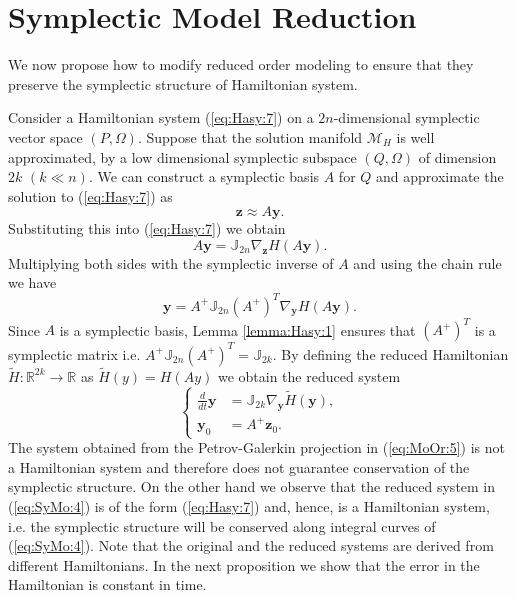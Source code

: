 \section{Symplectic Model Reduction} \label{chap:SyMo:1}
We now propose how to modify reduced order modeling to ensure that they preserve the symplectic structure of Hamiltonian system. 


Consider a Hamiltonian system (\ref{eq:Hasy:7}) on a $2n$-dimensional symplectic vector space $(P,\Omega)$. Suppose that the solution manifold $\mathcal M_H$ is well approximated, by a low dimensional symplectic subspace $(Q,\Omega)$ of dimension $2k$ $(k\ll n)$. We can construct a symplectic basis $A$ for $Q$ and approximate the solution to (\ref{eq:Hasy:7}) as
\begin{equation} \label{eq:SyMo:1}
	\mathbf z \approx A\mathbf y.
\end{equation}
Substituting this into (\ref{eq:Hasy:7}) we obtain
\begin{equation} \label{eq:SyMo:2}
	A\mathbf y = \mathbb{J}_{2n} \nabla_{\mathbf z} H(A \mathbf y). 
\end{equation}
Multiplying both sides with the symplectic inverse of $A$ and using the chain rule we have
\begin{equation} \label{eq:SyMo:3}
	\mathbf y = A^+ \mathbb J_{2n} (A^+)^T \nabla_{\mathbf y} H(A\mathbf y).
\end{equation}
Since $A$ is a symplectic basis, Lemma \ref{lemma:Hasy:1} ensures that $(A^+)^T$ is a symplectic matrix i.e. $A^+ \mathbb J_{2n} (A^+)^T = \mathbb{J}_{2k}$. By defining the reduced Hamiltonian $\tilde H:\mathbb R^{2k} \to \mathbb R$ as $\tilde H (y) = H(Ay)$ we obtain the reduced system
\begin{equation} \label{eq:SyMo:4}
\left\{
\begin{aligned}
	 \frac{d}{dt} \mathbf y &= \mathbb J_{2k} \nabla_{\mathbf y} \tilde H(\mathbf y), \\
	 \mathbf y_0 &= A^+ \mathbf z_0.
\end{aligned}
\right.
\end{equation}
The system obtained from the Petrov-Galerkin projection in (\ref{eq:MoOr:5}) is not a Hamiltonian system and therefore does not guarantee conservation of the symplectic structure. On the other hand we observe that the reduced system in (\ref{eq:SyMo:4}) is of the form (\ref{eq:Hasy:7}) and, hence, is a Hamiltonian system, i.e. the symplectic structure will be conserved along integral curves of (\ref{eq:SyMo:4}). Note that the original and the reduced systems are derived from different Hamiltonians. In the next proposition we show that the error in the Hamiltonian is constant in time. 


